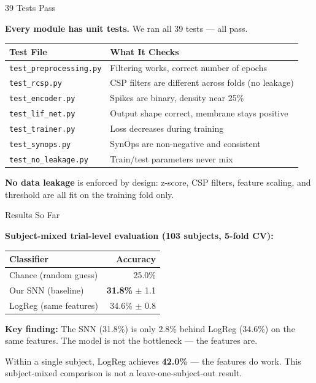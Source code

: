 \documentclass[10pt]{beamer}
\begin{document}
\begin{frame}{39 Tests Pass}

\small
\textbf{Every module has unit tests.} We ran all 39 tests --- all pass.

\vspace{4pt}
\begin{tabular}{ll}
\toprule
\textbf{Test File} & \textbf{What It Checks} \\
\midrule
\texttt{test\_preprocessing.py} & Filtering works, correct number of epochs \\
\texttt{test\_rcsp.py} & CSP filters are different across folds (no leakage) \\
\texttt{test\_encoder.py} & Spikes are binary, density near 25\% \\
\texttt{test\_lif\_net.py} & Output shape correct, membrane stays positive \\
\texttt{test\_trainer.py} & Loss decreases during training \\
\texttt{test\_synops.py} & SynOps are non-negative and consistent \\
\texttt{test\_no\_leakage.py} & Train/test parameters never mix \\
\bottomrule
\end{tabular}

\vspace{4pt}
\textbf{No data leakage} is enforced by design: z-score, CSP filters, feature scaling, and threshold are all fit on the training fold only.

\end{frame}

\begin{frame}{Results So Far}

\small
\textbf{Subject-mixed trial-level evaluation (103 subjects, 5-fold CV):}

\vspace{6pt}
\begin{tabular}{lr}
\toprule
\textbf{Classifier} & \textbf{Accuracy} \\
\midrule
Chance (random guess) & 25.0\% \\
Our SNN (baseline) & \textbf{31.8\%} $\pm$ 1.1 \\
LogReg (same features) & 34.6\% $\pm$ 0.8 \\
\bottomrule
\end{tabular}

\vspace{6pt}
\textbf{Key finding:} The SNN (31.8\%) is only 2.8\% behind LogReg (34.6\%) on the same features. The model is not the bottleneck --- the features are.

\vspace{4pt}
Within a single subject, LogReg achieves \textbf{42.0\%} --- the features do work. This
subject-mixed comparison is not a leave-one-subject-out result.

\end{frame}
\end{document}
